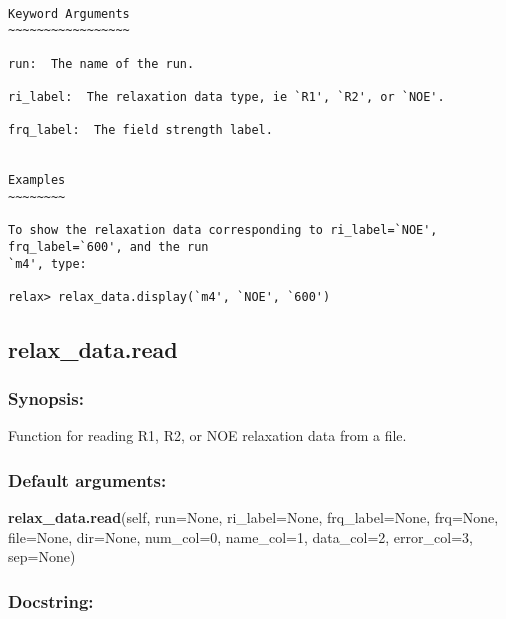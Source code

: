 {\scriptsize
\begin{verbatim}

Keyword Arguments
~~~~~~~~~~~~~~~~~

run:  The name of the run.

ri_label:  The relaxation data type, ie `R1', `R2', or `NOE'.

frq_label:  The field strength label.


Examples
~~~~~~~~

To show the relaxation data corresponding to ri_label=`NOE', frq_label=`600', and the run
`m4', type:

relax> relax_data.display(`m4', `NOE', `600')
\end{verbatim}
}



\newpage

\subsection{relax\_data.read}


\subsubsection{Synopsis:}

Function for reading R1, R2, or NOE relaxation data from a file.

\subsubsection{Default arguments:}

\textsf{\textbf{relax\_data.read}(self, run=None, ri\_label=None, frq\_label=None, frq=None, file=None, dir=None, num\_col=0, name\_col=1, data\_col=2, error\_col=3, sep=None)
}


\subsubsection{Docstring:}

